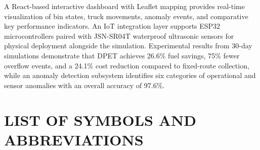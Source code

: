\documentclass[12pt,a4paper]{report}
\begin{document}
\indent A React-based interactive dashboard with Leaflet mapping provides real-time visualization of bin states, truck movements, anomaly events, and comparative key performance indicators. An IoT integration layer supports ESP32 microcontrollers paired with JSN-SR04T waterproof ultrasonic sensors for physical deployment alongside the simulation. Experimental results from 30-day simulations demonstrate that DPET achieves 26.6\% fuel savings, 75\% fewer overflow events, and a 24.1\% cost reduction compared to fixed-route collection, while an anomaly detection subsystem identifies six categories of operational and sensor anomalies with an overall accuracy of 97.6\%.

\clearpage

\renewcommand{\contentsname}{TABLE OF CONTENTS}
\tableofcontents\clearpage
\renewcommand{\listfigurename}{FIGURE LIST}
\listoffigures\clearpage
\renewcommand{\listtablename}{TABLE LIST}
\listoftables\clearpage

\chapter*{LIST OF SYMBOLS AND ABBREVIATIONS}
\end{document}
